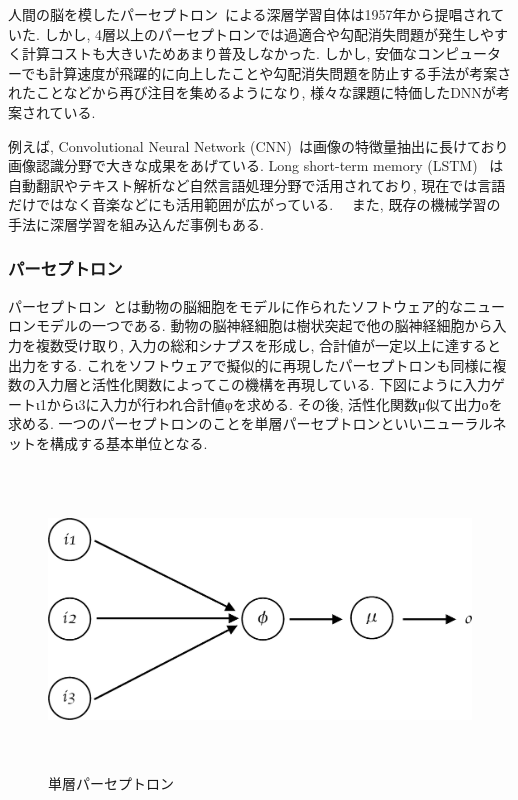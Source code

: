 人間の脳を模したパーセプトロン~\cite{Perceptron}による深層学習自体は1957年から提唱されていた. しかし, 4層以上のパーセプトロンでは過適合や勾配消失問題が発生しやすく計算コストも大きいためあまり普及しなかった.
しかし, 安価なコンピューターでも計算速度が飛躍的に向上したことや勾配消失問題を防止する手法が考案されたことなどから再び注目を集めるようになり, 様々な課題に特価したDNNが考案されている.

例えば, Convolutional Neural Network (CNN)~\cite{CNN}は画像の特徴量抽出に長けており画像認識分野で大きな成果をあげている.
Long short-term memory (LSTM) ~\cite{LSTM}は自動翻訳やテキスト解析など自然言語処理分野で活用されており, 現在では言語だけではなく音楽などにも活用範囲が広がっている.~\cite{LSTMMusic}~\cite{MusicGenerate}
また, 既存の機械学習の手法に深層学習を組み込んだ事例もある.~\cite{DQN}

\subsubsection{パーセプトロン}

パーセプトロン~\cite{Perceptron}とは動物の脳細胞をモデルに作られたソフトウェア的なニューロンモデルの一つである.
動物の脳神経細胞は樹状突起で他の脳神経細胞から入力を複数受け取り, 入力の総和シナプスを形成し, 合計値が一定以上に達すると出力をする. 
これをソフトウェアで擬似的に再現したパーセプトロンも同様に複数の入力層と活性化関数によってこの機構を再現している.
下図にように入力ゲートι1からι3に入力が行われ合計値φを求める. その後, 活性化関数μ似て出力οを求める.
一つのパーセプトロンのことを単層パーセプトロンといいニューラルネットを構成する基本単位となる. 

\begin{figure}[H]
    \centering
    \includegraphics[clip,height = 8.0cm]{assets/Single_Perceptron.eps}
    \caption{単層パーセプトロン}  \label{SinglePerceptron}
\end{figure}


